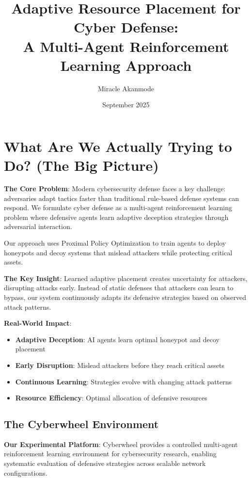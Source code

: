\documentclass[11pt]{article}
\title{Adaptive Resource Placement for Cyber Defense:\\ A Multi-Agent Reinforcement Learning Approach}
\author{Miracle Akanmode}
\date{September 2025}
\begin{document}
\maketitle

\tableofcontents

\section{What Are We Actually Trying to Do? (The Big Picture)}

\begin{foundation}
\textbf{The Core Problem}: Modern cybersecurity defense faces a key challenge: adversaries adapt tactics faster than traditional rule-based defense systems can respond. We formulate cyber defense as a multi-agent reinforcement learning problem where defensive agents learn adaptive deception strategies through adversarial interaction.

Our approach uses Proximal Policy Optimization to train agents to deploy honeypots and decoy systems that mislead attackers while protecting critical assets.
\end{foundation}

\begin{intuition}
\textbf{The Key Insight}: Learned adaptive placement creates uncertainty for attackers, disrupting attacks early. Instead of static defenses that attackers can learn to bypass, our system continuously adapts its defensive strategies based on observed attack patterns.

\textbf{Real-World Impact}:
\begin{itemize}
\item \textbf{Adaptive Deception}: AI agents learn optimal honeypot and decoy placement
\item \textbf{Early Disruption}: Mislead attackers before they reach critical assets
\item \textbf{Continuous Learning}: Strategies evolve with changing attack patterns
\item \textbf{Resource Efficiency}: Optimal allocation of defensive resources
\end{itemize}
\end{intuition}

\subsection{The Cyberwheel Environment}

\begin{foundation}
\textbf{Our Experimental Platform}: Cyberwheel provides a controlled multi-agent reinforcement learning environment for cybersecurity research, enabling systematic evaluation of defensive strategies across scalable network configurations.
\end{foundation}
\end{document}
